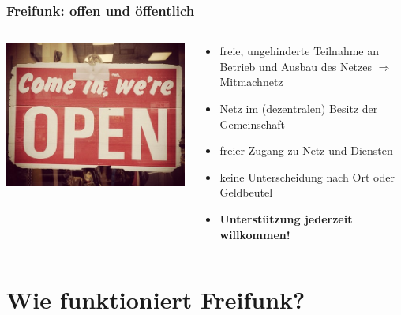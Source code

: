 \documentclass[10pt]{beamer}
\begin{document}
\begin{frame}
	\frametitle{Freifunk: offen und öffentlich}
	\begin{columns}[c]
		\begin{column}{5cm}
			\includegraphics[width=\textwidth]{images/open}
		\end{column}
		\begin{column}{7cm}
			\begin{itemize}[<+->]
				\item freie, ungehinderte Teilnahme an Betrieb und Ausbau des Netzes $\Rightarrow$ Mitmachnetz
				\item Netz im (dezentralen) Besitz der Gemeinschaft
				\item freier Zugang zu Netz und Diensten
				\item keine Unterscheidung nach Ort oder Geldbeutel
				\item \textbf{Unterstützung jederzeit willkommen!}
			\end{itemize}
		\end{column}
	\end{columns}	
\end{frame}



\section{Wie funktioniert Freifunk?}
\end{document}
